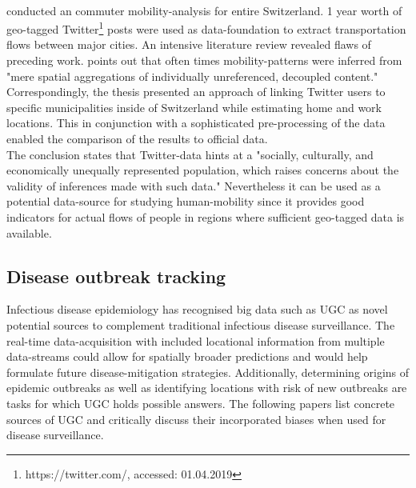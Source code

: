 \paragraph*{\textcite{Grossenbacher2014}} conducted an commuter mobility-analysis for entire Switzerland. 1 year worth of geo-tagged Twitter\footnote{https://twitter.com/, accessed: 01.04.2019} posts were used as data-foundation to extract transportation flows between major cities. An intensive literature review revealed flaws of preceding work. \citeauthor[p.5]{Grossenbacher2014} points out that often times mobility-patterns were inferred from "mere spatial aggregations of individually unreferenced, decoupled content." Correspondingly, the thesis presented an approach of linking Twitter users to specific municipalities inside of Switzerland while estimating home and work locations. This in conjunction with a sophisticated pre-processing of the data enabled the comparison of the results to official data.\\
The conclusion states that Twitter-data hints at a "socially, culturally, and economically unequally represented population, which raises concerns about the validity of inferences made with such data." \parencite[p.4]{Grossenbacher2014} Nevertheless it can be used as a potential data-source for studying human-mobility since it provides good indicators for actual flows of people in regions where sufficient geo-tagged data is available.

\subsection{Disease outbreak tracking}
Infectious disease epidemiology has recognised big data such as UGC as novel potential sources to complement traditional infectious disease surveillance. The real-time data-acquisition with included locational information from multiple data-streams could allow for spatially broader predictions and would help formulate future disease-mitigation strategies. Additionally, determining origins of epidemic outbreaks as well as identifying locations with risk of new outbreaks are tasks for which UGC holds possible answers. The following papers list concrete sources of UGC and critically discuss their incorporated biases when used for disease surveillance.\\

